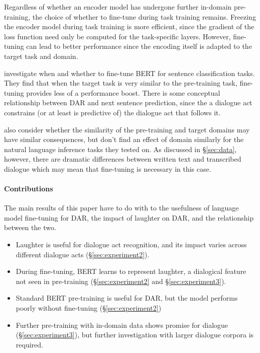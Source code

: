 \documentclass[11pt,a4paper]{article}
\begin{document}
Regardless of whether an encoder model has undergone further in-domain pre-training, the choice of whether to fine-tune during task training remains.
Freezing the encoder model during task training is more efficient, since the gradient of the loss function need only be computed for the task-specific layers.
However, fine-tuning can lead to better performance since the encoding itself is adapted to the target task and domain.

\citet{petersTuneNotTune2019} investigate when and whether to fine-tune BERT for sentence classification tasks.
They find that when the target task is very similar to the pre-training task, fine-tuning provides less of a performance boost.
There is some conceptual relationship between DAR and next sentence prediction, since the a dialogue act constrains (or at least is predictive of) the dialogue act that follows it.

\citet{petersTuneNotTune2019} also consider whether the similarity of the pre-training and target domains may have similar consequences, but don't find an effect of domain similarly for the natural language inference tasks they tested on.
As discussed in \S\ref{sec:data}, however, there are dramatic differences between written text and transcribed dialogue which may mean that fine-tuning is necessary in this case.




\paragraph{Contributions}
The main results of this paper have to do with to the usefulness of language model fine-tuning for DAR, the impact of laughter on DAR, and the relationship between the two.
\begin{itemize}
  \item Laughter is useful for dialogue act recognition, and its impact varies across different dialogue acts (\S\ref{sec:experiment2}).
  \item During fine-tuning, BERT learns to represent laughter, a dialogical feature not seen in pre-training (\S\ref{sec:experiment2} and \S\ref{sec:experiment3}).
  \item Standard BERT pre-training is useful for DAR, but the model performs poorly without fine-tuning (\S\ref{sec:experiment2})
  \item Further pre-training with in-domain data shows promise for dialogue (\S\ref{sec:experiment3}), but further investigation with larger dialogue corpora is required.
\end{itemize}
\end{document}
